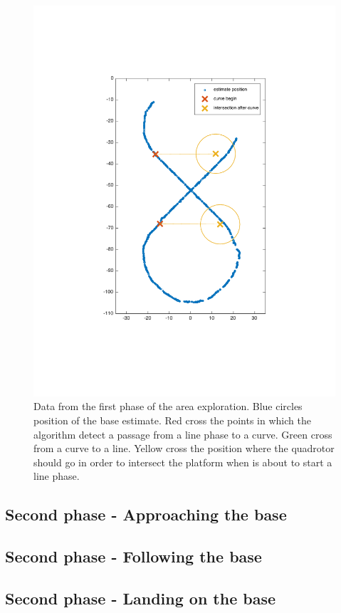 \begin{figure}[!htbp]
    \centering
    \includegraphics[width=1.0\textwidth]{img/following_platform_normal_map_intersection.pdf}
    \caption{Data from the first phase of the area exploration. Blue circles position of the base estimate. Red cross the points in which the algorithm detect a passage from a line phase to a curve. Green cross from a curve to a line. Yellow cross the position where the quadrotor should go in order to intersect the platform when is about to start a line phase.}
    \label{fig:map_intersections}
\end{figure}


\subsection{Second phase - Approaching the base}

\subsection{Second phase - Following the base}

\subsection{Second phase - Landing on the base}
